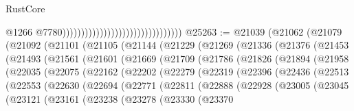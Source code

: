 \begin{lexlean}{RustCore}
\begin{coremodule}
                                                                    @1266
                                                                    @7780))))))))))))))))))))))))))))))))
@25263 := @21039
    (@21062
      (@21079
        (@21092
          (@21101
            (@21105
              (@21144
                (@21229
                  (@21269
                    (@21336
                      (@21376
                        (@21453
                          (@21493
                            (@21561
                              (@21601
                                (@21669
                                  (@21709
                                    (@21786
                                      (@21826
                                        (@21894
                                          (@21958
                                            (@22035
                                              (@22075
                                                (@22162
                                                  (@22202
                                                    (@22279
                                                      (@22319
                                                        (@22396
                                                          (@22436
                                                            (@22513
                                                              (@22553
                                                                (@22630
                                                                  (@22694
                                                                    (@22771
                                                                      (@22811
                                                                        (@22888
                                                                          (@22928
                                                                            (@23005
                                                                              (@23045
                                                                                (@23121
                                                                                  (@23161
                                                                                    (@23238
                                                                                      (@23278
                                                                                        (@23330
                                                                                          (@23370

\end{coremodule}
\end{lexlean}
